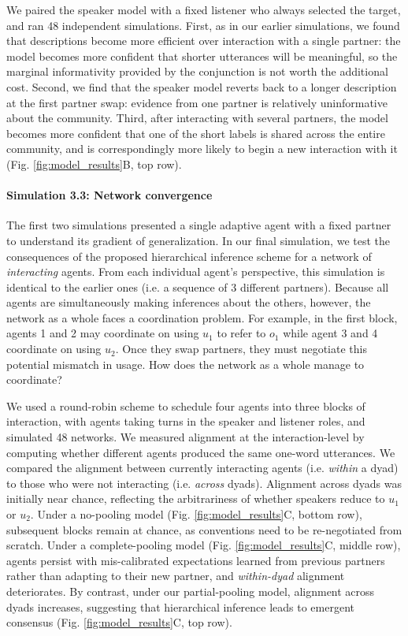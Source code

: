 We paired the speaker model with a fixed listener who always selected the target, and ran 48 independent simulations.
First, as in our earlier simulations, we found that descriptions become more efficient over interaction with a single partner: the model becomes more confident that shorter utterances will be meaningful, so the marginal informativity provided by the conjunction is not worth the additional cost.
Second, we find that the speaker model reverts back to a longer description at the first partner swap: evidence from one partner is relatively uninformative about the community.
Third, after interacting with several partners, the model becomes more confident that one of the short labels is shared across the entire community, and is correspondingly more likely to begin a new interaction with it (Fig. \ref{fig:model_results}B, top row).

\paragraph{Simulation 3.3: Network convergence}

The first two simulations presented a single adaptive agent with a fixed partner to understand its gradient of generalization. 
In our final simulation, we test the consequences of the proposed hierarchical inference scheme for a network of \emph{interacting} agents.
From each individual agent's perspective, this simulation is identical to the earlier ones (i.e. a sequence of 3 different partners).
Because all agents are simultaneously making inferences about the others, however, the network as a whole faces a coordination problem.
For example, in the first block, agents 1 and 2 may coordinate on using $u_1$ to refer to $o_1$ while agent 3 and 4 coordinate on using $u_2$. 
Once they swap partners, they must negotiate this potential mismatch in usage. 
How does the network as a whole manage to coordinate?

We used a round-robin scheme to schedule four agents into three blocks of interaction, with agents taking turns in the speaker and listener roles, and simulated 48 networks.
We measured alignment at the interaction-level by computing whether different agents produced the same one-word utterances. 
We compared the alignment between currently interacting agents (i.e. \emph{within} a dyad) to those who were not interacting (i.e. \emph{across} dyads).
Alignment across dyads was initially near chance, reflecting the arbitrariness of whether speakers reduce to $u_1$ or $u_2$. 
Under a no-pooling model (Fig. \ref{fig:model_results}C, bottom row), subsequent blocks remain at chance, as conventions need to be re-negotiated from scratch.
Under a complete-pooling model (Fig. \ref{fig:model_results}C, middle row), agents persist with mis-calibrated expectations learned from previous partners rather than adapting to their new partner, and \emph{within-dyad} alignment deteriorates.
By contrast, under our partial-pooling model, alignment across dyads increases, suggesting that hierarchical inference leads to emergent consensus (Fig. \ref{fig:model_results}C, top row).


